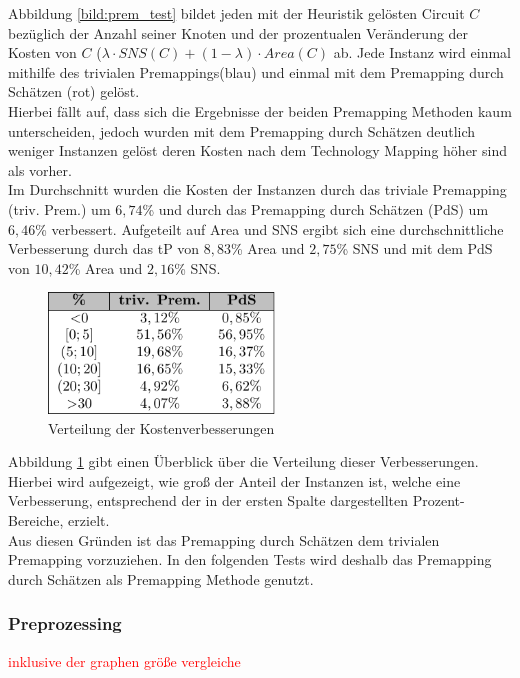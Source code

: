 \documentclass[11pt, a4paper, german]{article}
\newcommand{\TM}{Technology  Mapping }
\begin{document}
Abbildung \ref{bild:prem_test} bildet jeden mit der Heuristik gel\"osten Circuit $C$ bez\"uglich der Anzahl seiner Knoten und der prozentualen Ver\"anderung der Kosten von $C$ ($\lambda \cdot SNS(C) + (1-\lambda) \cdot Area(C)$ ab. Jede Instanz wird einmal mithilfe des trivialen Premappings(blau) und einmal mit dem Premapping durch Sch\"atzen (rot) gel\"ost.\\
Hierbei f\"allt auf, dass sich die Ergebnisse der beiden Premapping Methoden kaum unterscheiden, jedoch wurden mit dem Premapping durch Sch\"atzen deutlich weniger Instanzen gel\"ost deren Kosten nach dem \TM h\"oher sind als vorher. \\

Im Durchschnitt wurden die Kosten der Instanzen durch das triviale Premapping (triv. Prem.) um $6,74$\% und durch das Premapping durch Sch\"atzen (PdS) um $6,46$\% verbessert. Aufgeteilt auf Area und SNS ergibt sich eine durchschnittliche Verbesserung durch das tP von $8,83$\% Area und $2,75 $\% SNS und mit dem PdS von $10,42$\% Area und $2,16$\% SNS.\\
\begin{figure}
		\includegraphics[width = 6cm]{pictures/tex_files/analysis/premapping_table}
		\caption{Verteilung der Kostenverbesserungen}
		\label{bild:premapping_table}
\end{figure}

Abbildung \ref{bild:premapping_table} gibt einen \"Uberblick \"uber die Verteilung dieser Verbesserungen. Hierbei wird aufgezeigt, wie gro{\ss} der Anteil der Instanzen ist, welche
eine Verbesserung, entsprechend der in der ersten Spalte dargestellten Prozent-Bereiche, erzielt.\\

Aus diesen Gr\"unden ist das Premapping durch Sch\"atzen dem trivialen Premapping vorzuziehen. In den folgenden Tests wird deshalb das Premapping durch Sch\"atzen als Premapping Methode genutzt.

\subsubsection{Preprozessing}
\textcolor{red}{inklusive der graphen größe vergleiche}
\end{document}
